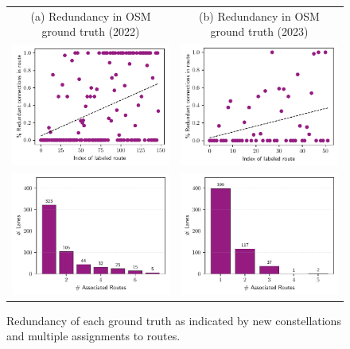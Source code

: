 \begin{figure}[t]
\centering 
\begin{tabular}{cc}
\footnotesize{(a) Redundancy in OSM ground truth (2022)} & \footnotesize{(b) Redundancy in OSM ground truth (2023)} \\
\includegraphics[width=0.45\linewidth]{images/matching-ground-truth-progression-osm-old.pdf} & \includegraphics[width=0.45\linewidth]{images/matching-ground-truth-progression-osm.pdf} \\
\includegraphics[width=0.45\linewidth]{images/matching-ground-truth-lsas-per-route-osm-old.pdf} & \includegraphics[width=0.45\linewidth]{images/matching-ground-truth-lsas-per-route-osm.pdf} \\
\end{tabular}
\caption{Redundancy of each ground truth as indicated by new constellations and multiple assignments to routes.}
\label{fig:ground-truth-routes-per-lanes-osm}
\end{figure}

